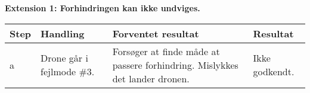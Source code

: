 \textbf{Extension 1: Forhindringen kan ikke undviges.}
\begin{table}[H]
	\centering
		\begin{tabular}{|l|p{5 cm}|p{5 cm}|p{2.5 cm}|} 
		\hline
			\textbf{Step} & \textbf{Handling} & \textbf{Forventet resultat} & \textbf{Resultat} \\ \hline
			a & Drone går i fejlmode \#3. & Forsøger at finde måde at passere forhindring. Mislykkes det lander dronen. & Ikke godkendt. \\ \hline
		\end{tabular}
\end{table}


